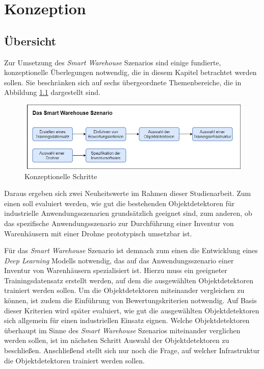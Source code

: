\chapter{Konzeption}

\section{Übersicht}

Zur Umsetzung des \textit{Smart Warehouse} Szenarios sind einige fundierte, konzeptionelle Überlegungen notwendig, die in diesem Kapitel betrachtet werden sollen. Sie beschränken sich auf sechs übergeordnete Themenbereiche, die in Abbildung \ref{schritte} dargestellt sind. 

\begin{figure}[ht]
	\begin{center}
		\includegraphics[width=15cm]{Bilder/blockdiagramm.png} 
		\caption[Konzeptionelle Schritte]{Konzeptionelle Schritte}
		\label{schritte}
	\end{center}
\end{figure}

Daraus ergeben sich zwei Neuheitswerte im Rahmen dieser Studienarbeit. Zum einen soll evaluiert werden, wie gut die bestehenden Objektdetektoren für industrielle Anwendungsszenarien grundsätzlich geeignet sind, zum anderen, ob das spezifische Anwendungsszenario zur Durchführung einer Inventur von Warenhäusern mit einer Drohne prototypisch umsetzbar ist.

Für das \textit{Smart Warehouse} Szenario ist demnach zum einen die Entwicklung eines \textit{Deep Learning} Modells notwendig, das auf das Anwendungsszenario einer Inventur von Warenhäusern spezialisiert ist. Hierzu muss ein geeigneter Trainingsdatensatz erstellt werden, auf dem die ausgewählten Objektdetektoren trainiert werden sollen. Um die Objektdetektoren miteinander vergleichen zu können, ist zudem die Einführung von Bewertungskriterien notwendig. Auf Basis dieser Kriterien wird später evaluiert, wie gut die ausgewählten Objektdetektoren sich allgemein für einen industriellen Einsatz eignen. Welche Objektdetektoren überhaupt im Sinne des \textit{Smart Warehouse} Szenarios miteinander verglichen werden sollen, ist im nächsten Schritt \glqq Auswahl der Objektdetektoren\grqq{} zu beschließen. Anschließend stellt sich nur noch die Frage, auf welcher Infrastruktur die Objektdetektoren trainiert werden sollen.

